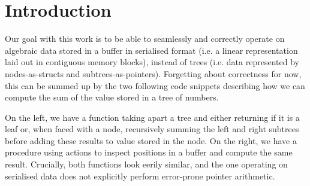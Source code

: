 \section{Introduction}

Our goal with this work is to be able to seamlessly and correctly
operate on algebraic data stored in a buffer in serialised format
(i.e. a linear representation laid out in contiguous memory blocks),
instead of trees
(i.e. data represented by nodes-as-structs and subtrees-as-pointers).
%
Forgetting about correctness for now, this can be summed up by the
two following code snippets describing how we can compute the sum
of the value stored in a tree of numbers.

\noindent
\begin{minipage}{.4\textwidth}
\end{minipage}
\hfill\begin{minipage}{.55\textwidth}
\end{minipage}

On the left, we have a function taking apart a tree and either returning
 if it is a leaf or, when faced with a node, recursively
summing the left and right subtrees before adding these results to value
stored in the node.
%
On the right, we have a procedure using  actions to inspect
positions in a buffer and compute the same result.
%
Crucially, both functions look eerily similar, and the one operating on
serialised data does not explicitly perform error-prone pointer arithmetic.
